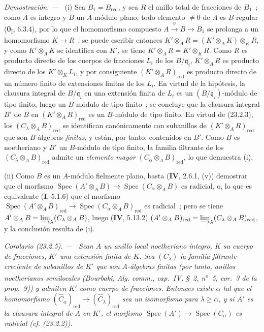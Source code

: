\documentclass[10pt,oneside]{book}
\makeatletter
\newcommand{\setmanualcurrentlabel}[1]{\def\@currentlabel{#1}}
\newenvironment{corollary}[1][]{%
  \setmanualcurrentlabel{#1}\par\medskip\noindent\itshape Corolario (#1). ---\ }{\par}
\newenvironment{proof}{%
  \par\medskip\noindent\textit{Demostración. ---\ }}{\par}
\makeatother
\begin{document}
\begin{proof}
(i) Sea $B_1=B_{\mathrm{red}}$, y sea $R$ el anillo total de
fracciones de $B_1$~; como $A$ es íntegro y $B$ un $A$-módulo plano, todo
elemento $\neq0$ de $A$ es $B$-regular (\textbf{0}\textsubscript{I}, 6.3.4), por lo que
el homomorfismo compuesto $A\xrightarrow{\varphi}B\to B_1$ se prolonga a un
homomorfismo $K\to R$~; se puede escribir entonces
$K'\otimes_AR=(K'\otimes_AK)\otimes_KR$, y como $K'\otimes_AK$
se identifica con $K'$, se tiene $K'\otimes_AR=K'\otimes_KR$. Como $R$ es producto
directo de los cuerpos de fracciones $L_i$ de los $B/\mathfrak q_i$,
$K'\otimes_AR$ es producto directo de los $K'\otimes_KL_i$, y por consiguiente
$(K'\otimes_AR)_{\mathrm{red}}$ es producto directo de un número finito
de extensiones finitas de los $L_i$. En virtud de la hipótesis, la clausura
integral de $B/\mathfrak q_i$ en una extensión finita de $L_i$ es un
$(B/\mathfrak q_i)$-módulo de tipo finito, luego un $B$-módulo de tipo finito~;
se concluye que la clausura integral $B'$ de $B$ en
$(K'\otimes_AR)_{\mathrm{red}}$ es un $B$-módulo de tipo finito. En virtud de
(23.2.3), los $(C_\lambda\otimes_AB)_{\mathrm{red}}$ se identifican
canónicamente con subanillos de $(K'\otimes_AR)_{\mathrm{red}}$ que son
$B$-álgebras \emph{finitas}, y están, por tanto, contenidos en $B'$. Como $B$ es noetheriano
y $B'$ un $B$-módulo de tipo finito, la familia filtrante de los
$(C_\lambda\otimes_AB)_{\mathrm{red}}$ admite un \emph{elemento mayor}
$(C_\alpha\otimes_AB)_{\mathrm{red}}$, lo que demuestra (i).

(ii) Como $B$ es un $A$-módulo fielmente plano, basta
(\textbf{IV}, 2.6.1, (v)) demostrar que el morfismo
$\operatorname{Spec}(A'\otimes_AB)\to
\operatorname{Spec}(C_\alpha\otimes_AB)$ es radicial, o, lo que es equivalente
(\textbf I, 5.1.6) que el morfismo
$\operatorname{Spec}(A'\otimes_AB)_{\mathrm{red}}\to
\operatorname{Spec}(C_\alpha\otimes_AB)_{\mathrm{red}}$ es radicial~; pero
se tiene $A'\otimes_AB=\varinjlim_\lambda(C_\lambda\otimes_AB)$, luego
(\textbf{IV}, 5.13.2)
$(A'\otimes_AB)_{\mathrm{red}}=
\varinjlim_\lambda(C_\lambda\otimes_AB)_{\mathrm{red}}$, y la conclusión
resulta de (i).
\end{proof}

\begin{corollary}[23.2.5]
\label{0.23.2.5-es}
Sean $A$ un anillo local noetheriano íntegro, $K$ su cuerpo de fracciones,
$K'$ una extensión finita de $K$. Sea $(C_\lambda)$ la familia filtrante
creciente de subanillos de $K'$ que son $A$-álgebras finitas \textup{(por tanto,
anillos noetherianos semilocales (Bourbaki, \emph{Alg. comm.}, cap.~IV,
§~2, n\textsuperscript{o}~5, cor.~3 de la prop.~9))} y admiten $K'$ como
cuerpo de fracciones. Entonces existe $\alpha$ tal que el homomorfismo
$(\widehat C_\alpha)_{\mathrm{red}}\to
(\widehat C_\lambda)_{\mathrm{red}}$ sea un isomorfismo para
$\lambda\geqslant\alpha$, y si $A'$ es la clausura integral de $A$ en
$K'$, el morfismo
$\operatorname{Spec}(A')\to\operatorname{Spec}(C_\alpha)$ es radicial
\textup{(cf. (23.2.2))}.
\end{corollary}
\end{document}
